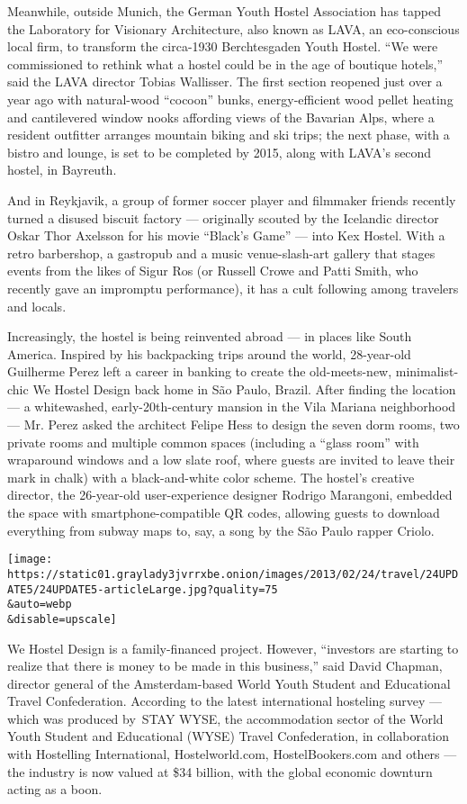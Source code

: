 Meanwhile, outside Munich, the German Youth Hostel Association has
tapped the Laboratory for Visionary Architecture, also known as LAVA, an
eco-conscious local firm, to transform the circa-1930 Berchtesgaden
Youth Hostel. ``We were commissioned to rethink what a hostel could be
in the age of boutique hotels,'' said the LAVA director Tobias
Wallisser. The first section reopened just over a year ago with
natural-wood ``cocoon'' bunks, energy-efficient wood pellet heating and
cantilevered window nooks affording views of the Bavarian Alps, where a
resident outfitter arranges mountain biking and ski trips; the next
phase, with a bistro and lounge, is set to be completed by 2015, along
with LAVA's second hostel, in Bayreuth.

And in Reykjavik, a group of former soccer player and filmmaker friends
recently turned a disused biscuit factory --- originally scouted by the
Icelandic director Oskar Thor Axelsson for his movie ``Black's Game''
--- into Kex Hostel. With a retro barbershop, a gastropub and a music
venue-slash-art gallery that stages events from the likes of Sigur Ros
(or Russell Crowe and Patti Smith, who recently gave an impromptu
performance), it has a cult following among travelers and locals.

Increasingly, the hostel is being reinvented abroad --- in places like
South America. Inspired by his backpacking trips around the world,
28-year-old Guilherme Perez left a career in banking to create the
old-meets-new, minimalist-chic We Hostel Design back home in São Paulo,
Brazil. After finding the location --- a whitewashed, early-20th-century
mansion in the Vila Mariana neighborhood --- Mr. Perez asked the
architect Felipe Hess to design the seven dorm rooms, two private rooms
and multiple common spaces (including a ``glass room'' with wraparound
windows and a low slate roof, where guests are invited to leave their
mark in chalk) with a black-and-white color scheme. The hostel's
creative director, the 26-year-old user-experience designer Rodrigo
Marangoni, embedded the space with smartphone-compatible QR codes,
allowing guests to download everything from subway maps to, say, a song
by the São Paulo rapper Criolo.

\texttt{[image: https://static01.graylady3jvrrxbe.onion/images/2013/02/24/travel/24UPDATE5/24UPDATE5-articleLarge.jpg?quality=75\\\&auto=webp\\\&disable=upscale]}

We Hostel Design is a family-financed project. However, ``investors are
starting to realize that there is money to be made in this business,''
said David Chapman, director general of the Amsterdam-based World Youth
Student and Educational Travel Confederation. According to the latest
international hosteling survey --- which was produced by~STAY WYSE, the
accommodation sector of the World Youth Student and Educational (WYSE)
Travel Confederation, in collaboration with Hostelling International,
Hostelworld.com, HostelBookers.com and others --- the industry is now
valued at \$34 billion, with the global economic downturn acting as a
boon.

